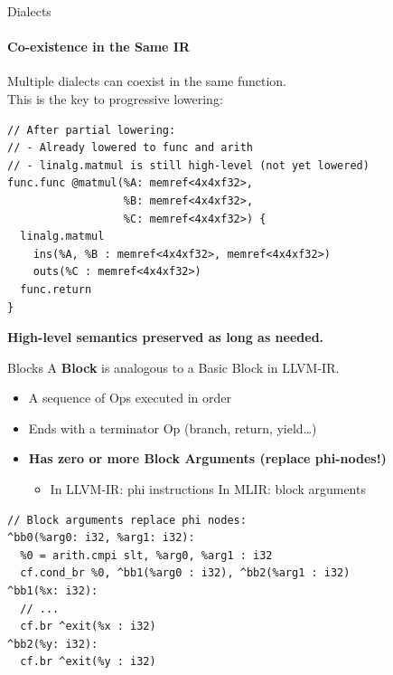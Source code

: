 \begin{frame}[fragile]{Dialects}
  \framesubtitle{Co-existence in the Same IR}
  Multiple dialects can coexist in the same function.\\
  This is the key to progressive lowering:

\begin{lstlisting}[language=none,basicstyle=\ttfamily\small]
// After partial lowering:
// - Already lowered to func and arith
// - linalg.matmul is still high-level (not yet lowered)
func.func @matmul(%A: memref<4x4xf32>,
                  %B: memref<4x4xf32>,
                  %C: memref<4x4xf32>) {
  linalg.matmul
    ins(%A, %B : memref<4x4xf32>, memref<4x4xf32>)
    outs(%C : memref<4x4xf32>)
  func.return
}
\end{lstlisting}

  \textbf{\textcolor{mainAccent}{%
    High-level semantics preserved as long as needed.}}
\end{frame}


\begin{frame}[fragile]{Blocks}
  A \textbf{\textcolor{mainAccent}{Block}} is analogous to a Basic Block in LLVM-IR.

  \begin{itemize}
    \item A sequence of Ops executed in order
    \item Ends with a terminator Op (branch, return, yield\ldots)
    \item \textbf{Has zero or more Block Arguments (replace phi-nodes!)}
      \begin{itemize}
        \item In LLVM-IR: phi instructions \; In MLIR: block arguments
      \end{itemize}
  \end{itemize}

\begin{lstlisting}[language=none,basicstyle=\ttfamily\small]
// Block arguments replace phi nodes:
^bb0(%arg0: i32, %arg1: i32):
  %0 = arith.cmpi slt, %arg0, %arg1 : i32
  cf.cond_br %0, ^bb1(%arg0 : i32), ^bb2(%arg1 : i32)
^bb1(%x: i32):
  // ...
  cf.br ^exit(%x : i32)
^bb2(%y: i32):
  cf.br ^exit(%y : i32)
\end{lstlisting}
\end{frame}


